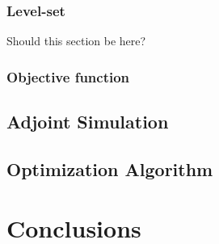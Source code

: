 \documentclass[11pt]{article}
\begin{document}
\subsubsection{Level-set}

Should this section be here?


\subsubsection{Objective function}

\subsection{Adjoint Simulation}

\subsection{Optimization Algorithm}

\section{Conclusions}

\printbibliography{}
\end{document}
